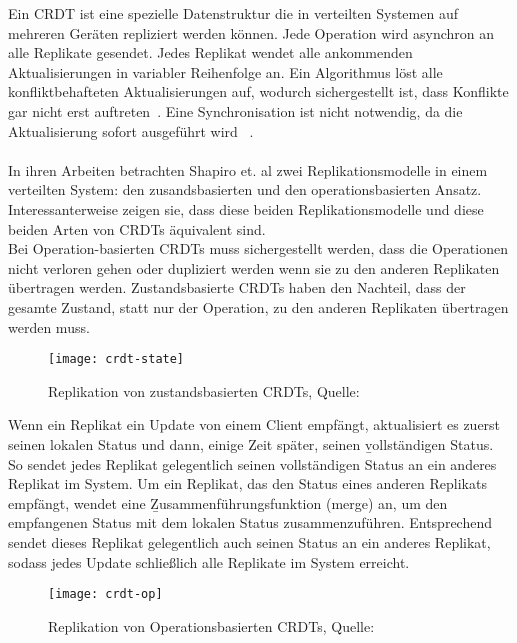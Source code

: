 %
%
Ein \gls{CRDT} ist eine spezielle Datenstruktur die in verteilten Systemen auf mehreren Geräten repliziert werden können. Jede Operation wird asynchron an alle Replikate gesendet. Jedes Replikat wendet alle ankommenden Aktualisierungen in variabler Reihenfolge an. Ein Algorithmus löst alle konfliktbehafteten Aktualisierungen auf, wodurch sichergestellt ist, dass Konflikte gar nicht erst auftreten~\cite{crdt_shapiro}. Eine Synchronisation ist nicht notwendig, da die Aktualisierung sofort ausgeführt wird ~\cite{crdt_shapiro2}.\\\\
%
In ihren Arbeiten betrachten Shapiro et. al zwei Replikationsmodelle in einem verteilten System: den zusandsbasierten und den operationsbasierten Ansatz.
Interessanterweise zeigen sie, dass diese beiden Replikationsmodelle und diese beiden Arten von CRDTs äquivalent sind.\\
Bei Operation-basierten \glspl{CRDT} muss sichergestellt werden, dass die Operationen nicht verloren gehen oder dupliziert werden wenn sie zu den anderen Replikaten übertragen werden.
Zustandsbasierte \glspl{CRDT} haben den Nachteil, dass der gesamte Zustand, statt nur der Operation, zu den anderen Replikaten übertragen werden muss.
%
%

\begin{figure}[H]
  \centering
  \texttt{[image: crdt-state]}
  \grayRule
  \caption[Replikation von zustandsbasierten \glspl{CRDT} Replikation]{Replikation von zustandsbasierten \glspl{CRDT}, Quelle: ~\cite{crdt_shapiro2}}
  \label{fig:crdt-state}
\end{figure}

Wenn ein Replikat ein Update von einem Client empfängt, aktualisiert es zuerst seinen lokalen Status und dann, einige Zeit später, seinen \b{vollständigen Status}.
So sendet jedes Replikat gelegentlich seinen vollständigen Status an ein anderes Replikat im System.
Um ein Replikat, das den Status eines anderen Replikats empfängt, wendet eine \b{Zusammenführungsfunktion} (merge) an, um den empfangenen Status mit dem lokalen Status zusammenzuführen.
Entsprechend sendet dieses Replikat gelegentlich auch seinen Status an ein anderes Replikat, sodass jedes Update schließlich alle Replikate im System erreicht.
%
%
\begin{figure}[H]
  \centering
  \texttt{[image: crdt-op]}
  \grayRule
  \caption[Replikation von Operationsbasierten \gls{CRDT}]{Replikation von Operationsbasierten \glspl{CRDT}, Quelle: ~\cite{crdt_shapiro2}}
  \label{fig:crdt-op}
\end{figure}

